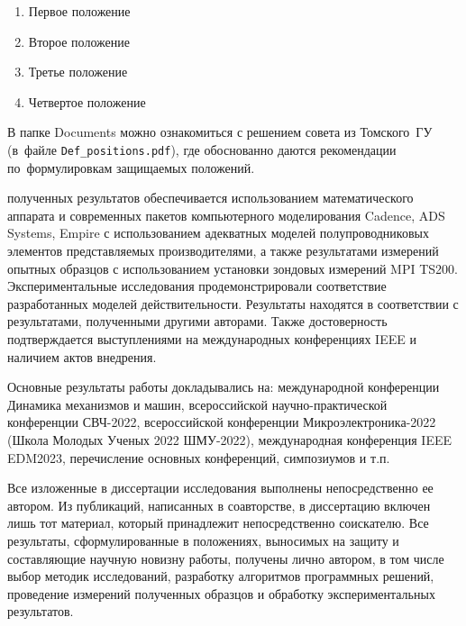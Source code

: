 {}
\begin{enumerate}[beginpenalty=10000] %
  \item Первое положение
  \item Второе положение
  \item Третье положение
  \item Четвертое положение
\end{enumerate}
В папке Documents можно ознакомиться с решением совета из Томского~ГУ
(в~файле \verb+Def_positions.pdf+), где обоснованно даются рекомендации
по~формулировкам защищаемых положений.

{\reliability} полученных результатов обеспечивается использованием математического аппарата и современных пакетов компьютерного моделирования Cadence, ADS Systems, Empire с использованием адекватных моделей полупроводниковых элементов представляемых производителями, а также результатами измерений опытных образцов с использованием установки зондовых измерений MPI TS200. Экспериментальные исследования продемонстрировали соответствие разработанных моделей действительности. Результаты находятся в соответствии с результатами, полученными другими авторами. Также достоверность подтверждается выступлениями на международных конференциях IEEE и наличием актов внедрения.

{\probation}
Основные результаты работы докладывались на:
международной конференции Динамика механизмов и машин, всероссийской научно-практической конференции СВЧ-2022, всероссийской конференции Микроэлектроника-2022 (Школа Молодых Ученых 2022 ШМУ-2022), международная конференция IEEE EDM2023, перечисление основных конференций, симпозиумов и т.\:п.

{\contribution} Все изложенные в диссертации исследования выполнены непосредственно ее автором. Из публикаций, написанных в соавторстве, в диссертацию включен лишь тот материал, который принадлежит непосредственно соискателю. Все результаты, сформулированные в положениях, выносимых на защиту и составляющие научную новизну работы, получены лично автором, в том числе выбор методик исследований, разработку алгоритмов программных решений, проведение измерений полученных образцов и обработку экспериментальных результатов.

